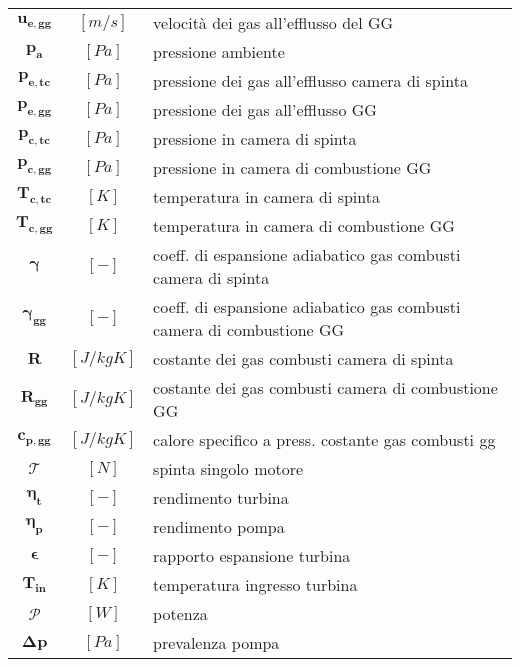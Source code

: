 \begin{multicols}{2}
{\begin{xltabular}{\linewidth}{cc>{\raggedright\arraybackslash}X}
		$\bm{u_{e,gg}}$ & $[m/s]$ & velocità dei gas all'efflusso del GG \\
		$\bm{p_a}$ & $[Pa]$ & pressione ambiente \\
		$\bm{p_{e,tc}}$ & $[Pa]$ & pressione dei gas all'efflusso camera di spinta \\
		$\bm{p_{e,gg}}$ & $[Pa]$ & pressione dei gas all'efflusso GG\\
		$\bm{p_{c,tc}}$ & $[Pa]$ & pressione in camera di spinta\\
		$\bm{p_{c,gg}}$ & $[Pa]$ & pressione in camera di combustione GG\\
		$\bm{T_{c,tc}}$ & $[K]$ & temperatura in camera di spinta\\
		$\bm{T_{c,gg}}$ & $[K]$ & temperatura in camera di combustione GG\\
		$\bm{\gamma}$ & $[-]$ & coeff. di espansione adiabatico gas combusti camera di spinta\\
		$\bm{\gamma_{gg}}$ & $[-]$ & coeff. di espansione adiabatico gas combusti camera di combustione GG\\
		$\bm{R}$ & $[J/kgK]$ & costante dei gas combusti camera di spinta\\
		$\bm{R_{gg}}$ & $[J/kgK]$ & costante dei gas combusti camera di combustione GG\\
		$\bm{c_{p,gg}}$ & $[J/kgK]$ & calore specifico a press. costante gas combusti gg\\
		$\bm{\mathcal{T}}$ & $[N]$ & spinta singolo motore\\
		$\bm{\eta_t}$ & $[-]$ & rendimento turbina\\
		$\bm{\eta_p}$ & $[-]$ & rendimento pompa\\
		$\bm{\epsilon}$ & $[-]$ & rapporto espansione turbina\\
		$\bm{T_{in}}$ & $[K]$ & temperatura ingresso turbina\\
		$\bm{\mathcal{P}}$ & $[W]$ & potenza\\
		$\bm{\Delta p}$ & $[Pa]$ & prevalenza pompa
	\end{xltabular}
	\unskip
	\unpenalty
	\unpenalty}
	\unvbox\ltmcbox


\end{multicols}
